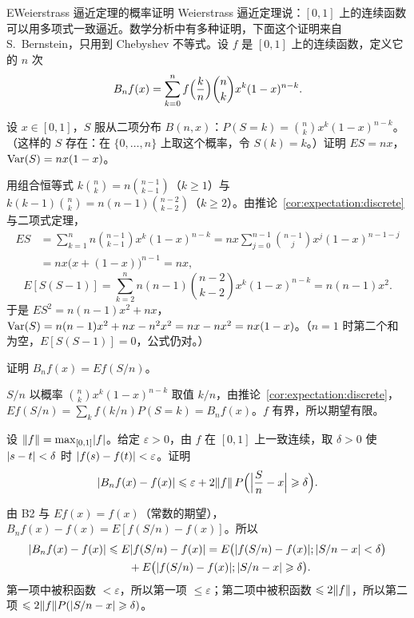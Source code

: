 
\begin{probleme}{E}{Weierstrass 逼近定理的概率证明}
Weierstrass 逼近定理说：$[0,1]$ 上的连续函数可以用多项式一致逼近。数学分析中有多种证明，下面这个证明来自 S.\ Bernstein，只用到 Chebyshev 不等式。设 $f$ 是 $[0,1]$ 上的连续函数，定义它的 $n$ 次 
\[
B_nf(x)=\sum_{k=0}^nf\Bigl(\frac kn\Bigr)\binom nkx^k(1-x)^{n-k}.
\]
\begin{questions}
\item 设 $x\in[0,1]$，$S$ 服从二项分布 $B(n,x)$：$P(S=k)=\binom nkx^k(1-x)^{n-k}$。（这样的 $S$ 存在：在 $\{0,\dots,n\}$ 上取这个概率，令 $S(k)=k$。）证明 $ES=nx$，$\operatorname{Var}(S)=nx(1-x)$。
\begin{solution}
用组合恒等式 $k\binom nk=n\binom{n-1}{k-1}$（$k\geqslant1$）与 $k(k-1)\binom nk=n(n-1)\binom{n-2}{k-2}$（$k\geqslant2$）。由推论~\ref{cor:expectation:discrete} 与二项式定理，
\[
\begin{aligned}
ES&=\sum_{k=1}^nn\binom{n-1}{k-1}x^k(1-x)^{n-k}=nx\sum_{j=0}^{n-1}\binom{n-1}jx^j(1-x)^{n-1-j}\\
&=nx\bigl(x+(1-x)\bigr)^{n-1}=nx,
\end{aligned}
\]
\[
E[S(S-1)]=\sum_{k=2}^nn(n-1)\binom{n-2}{k-2}x^k(1-x)^{n-k}=n(n-1)x^2 .
\]
于是 $ES^2=n(n-1)x^2+nx$，$\operatorname{Var}(S)=n(n-1)x^2+nx-n^2x^2=nx-nx^2=nx(1-x)$。（$n=1$ 时第二个和为空，$E[S(S-1)]=0$，公式仍对。）
\end{solution}

\item 证明 $B_nf(x)=Ef(S/n)$。
\begin{solution}
$S/n$ 以概率 $\binom nkx^k(1-x)^{n-k}$ 取值 $k/n$，由推论~\ref{cor:expectation:discrete}，$Ef(S/n)=\sum_kf(k/n)P(S=k)=B_nf(x)$。$f$ 有界，所以期望有限。
\end{solution}

\item 设 $\lVert f\rVert=\max_{[0,1]}\lvert f\rvert$。给定 $\varepsilon>0$，由 $f$ 在 $[0,1]$ 上一致连续，取 $\delta>0$ 使 $\lvert s-t\rvert<\delta$ 时 $\lvert f(s)-f(t)\rvert<\varepsilon$。证明
\[
\lvert B_nf(x)-f(x)\rvert\leqslant\varepsilon+2\lVert f\rVert\,P\Bigl(\Bigl\lvert\frac Sn-x\Bigr\rvert\geqslant\delta\Bigr).
\]
\begin{solution}
由 B2 与 $Ef(x)=f(x)$（常数的期望），$B_nf(x)-f(x)=E[f(S/n)-f(x)]$。所以
\[
\begin{aligned}
\lvert B_nf(x)-f(x)\rvert&\leqslant E\lvert f(S/n)-f(x)\rvert=E\bigl(\lvert f(S/n)-f(x)\rvert;\lvert S/n-x\rvert<\delta\bigr)\\
&\qquad+E\bigl(\lvert f(S/n)-f(x)\rvert;\lvert S/n-x\rvert\geqslant\delta\bigr).
\end{aligned}
\]
第一项中被积函数 $<\varepsilon$，所以第一项 $\leqslant\varepsilon$；第二项中被积函数 $\leqslant2\lVert f\rVert$，所以第二项 $\leqslant2\lVert f\rVert P(\lvert S/n-x\rvert\geqslant\delta)$。
\end{solution}


\end{questions}
\end{probleme}
